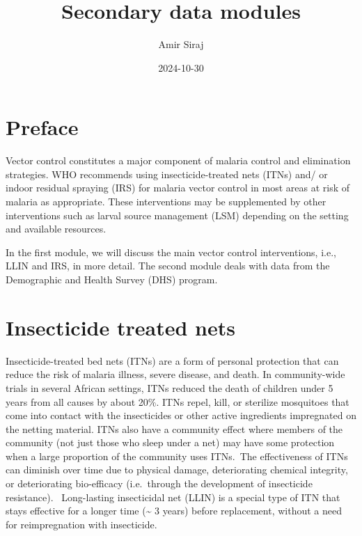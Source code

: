\documentclass[
  letterpaper,
  DIV=11,
  numbers=noendperiod]{scrreprt}
\title{Secondary data modules}
\author{Amir Siraj}
\date{2024-10-30}
\renewcommand*\contentsname{Table of contents}
\newcommand\contentsname{Table of contents}
\begin{document}
\maketitle
\ifdefined\Shaded\renewenvironment{Shaded}{\begin{tcolorbox}[borderline west={3pt}{0pt}{shadecolor}, interior hidden, enhanced, sharp corners, boxrule=0pt, breakable, frame hidden]}{\end{tcolorbox}}\fi

\renewcommand*\contentsname{Table of contents}
{
\hypersetup{linkcolor=}
\setcounter{tocdepth}{2}
\tableofcontents
}

\hypertarget{preface}{%
\chapter*{Preface}\label{preface}}


Vector control constitutes a major component of malaria control and
elimination strategies. WHO recommends using insecticide-treated nets
(ITNs) and/ or indoor residual spraying (IRS) for malaria vector control
in most areas at risk of malaria as appropriate. These interventions may
be supplemented by other interventions such as larval source management
(LSM) depending on the setting and available resources.

In the first module, we will discuss the main vector control
interventions, i.e., LLIN and IRS, in more detail. The second module
deals with data from the Demographic and Health Survey (DHS) program.


\hypertarget{insecticide-treated-nets}{%
\chapter{Insecticide treated nets}\label{insecticide-treated-nets}}

Insecticide-treated bed nets (ITNs) are a form of personal protection
that can reduce the risk of malaria illness, severe disease, and death.
In community-wide trials in several African settings, ITNs reduced the
death of children under 5 years from all causes by about 20\%. ITNs
repel, kill, or sterilize mosquitoes that come into contact with the
insecticides or other active ingredients impregnated on the netting
material. ITNs also have a community effect where members of the
community (not just those who sleep under a net) may have some
protection when a large proportion of the community uses ITNs.~The
effectiveness of ITNs can diminish over time due to physical damage,
deteriorating chemical integrity, or deteriorating bio-efficacy
(i.e.~through the development of insecticide resistance).~ Long-lasting
insecticidal net (LLIN) is a special type of ITN that stays effective
for a longer time (\textasciitilde{} 3 years) before replacement,
without a need for reimpregnation with insecticide.~
\end{document}
